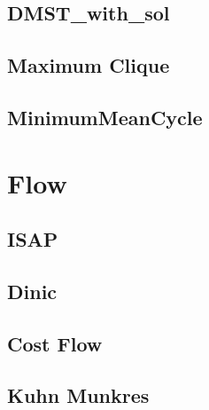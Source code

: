 \documentclass[10pt,twocolumn,oneside]{article}
\begin{document}
%

\subsection{DMST\_with\_sol}


\subsection{Maximum Clique}


\subsection{MinimumMeanCycle}


\section{Flow}
\subsection{ISAP} %


\subsection{Dinic} %


\subsection{Cost Flow} %


%

\subsection{Kuhn Munkres}

\end{document}

